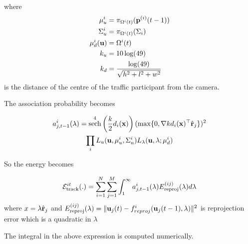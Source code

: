 \documentclass[10pt,twocolumn,letterpaper]{article}
\DeclareMathOperator{\sech}{sech}
\begin{document}
where 
\begin{align}
  \mu_u^i &= \pi_{\Omega^{i}(t)}(\mathbf{p}^{(i)}(t-1)) \label{eq:muiudef}\\
  \Sigma_u^i &= \pi_{\Omega^{i}(t)}(\Sigma_i) \label{eq:sigmauidef}\\
  \mu^i_d(\mathbf{u}) &= \Omega^{i}(t)\\
  k_u &= 10\log(49)\\
  k_d &= \frac{\log(49)}{\sqrt{h^2 + l^2 + w^2}}
  \label{eq:ptransmissionInit}
\end{align}
is the distance of the centre of the traffic participant from the camera.


The association probability becomes

\newcommand{\Lu}{L_u(\mathbf{u}, \mu^i_u,\Sigma^i_u)}
\newcommand{\Llambda}{L_{\lambda}(\mathbf{u}, \lambda; \mu^i_d)}
\begin{multline}
  \assocP = 
    \sech^4\left(\frac{k}{2}\dishort\right)
    (\max \{ 0, \nabla k\dishort^\top\ray \})^2\\
  \prod_i \Lu
    \Llambda \\
    \label{eq:assocCoeffEval}
\end{multline}

So the energy becomes

\begin{multline}
  \label{eq:integrand}
  \mathcal{E}^{it}_{\text{track}}(.) = 
    \sum_{i = 1}^N
    \sum_{j = 1}^{M}
    \int_1^{\infty}
    a^{i}_{j,t-1}(\lambda)
    E^{(ij)}_{\text{reproj}}(\lambda)
    d\lambda
\end{multline}
where $x = \lambda \hat{\mathbf{r}}_j$ and $E^{(ij)}_{\text{reproj}}(\lambda) = \|\mathbf{u}_j(t) -
f^i_{reproj}(\mathbf{u}_j(t-1), \lambda)\|^2$ is reprojection error which is a
quadratic in $\lambda$

The integral in the above expression is computed numerically.
\end{document}
